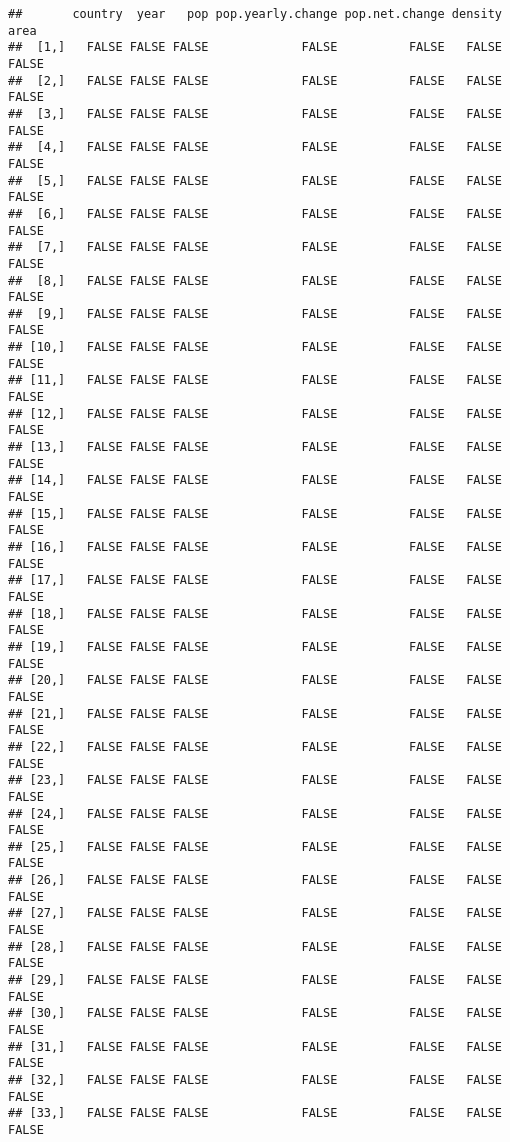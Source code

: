 \documentclass[
]{article}
\begin{document}
\begin{verbatim}
##       country  year   pop pop.yearly.change pop.net.change density  area
##  [1,]   FALSE FALSE FALSE             FALSE          FALSE   FALSE FALSE
##  [2,]   FALSE FALSE FALSE             FALSE          FALSE   FALSE FALSE
##  [3,]   FALSE FALSE FALSE             FALSE          FALSE   FALSE FALSE
##  [4,]   FALSE FALSE FALSE             FALSE          FALSE   FALSE FALSE
##  [5,]   FALSE FALSE FALSE             FALSE          FALSE   FALSE FALSE
##  [6,]   FALSE FALSE FALSE             FALSE          FALSE   FALSE FALSE
##  [7,]   FALSE FALSE FALSE             FALSE          FALSE   FALSE FALSE
##  [8,]   FALSE FALSE FALSE             FALSE          FALSE   FALSE FALSE
##  [9,]   FALSE FALSE FALSE             FALSE          FALSE   FALSE FALSE
## [10,]   FALSE FALSE FALSE             FALSE          FALSE   FALSE FALSE
## [11,]   FALSE FALSE FALSE             FALSE          FALSE   FALSE FALSE
## [12,]   FALSE FALSE FALSE             FALSE          FALSE   FALSE FALSE
## [13,]   FALSE FALSE FALSE             FALSE          FALSE   FALSE FALSE
## [14,]   FALSE FALSE FALSE             FALSE          FALSE   FALSE FALSE
## [15,]   FALSE FALSE FALSE             FALSE          FALSE   FALSE FALSE
## [16,]   FALSE FALSE FALSE             FALSE          FALSE   FALSE FALSE
## [17,]   FALSE FALSE FALSE             FALSE          FALSE   FALSE FALSE
## [18,]   FALSE FALSE FALSE             FALSE          FALSE   FALSE FALSE
## [19,]   FALSE FALSE FALSE             FALSE          FALSE   FALSE FALSE
## [20,]   FALSE FALSE FALSE             FALSE          FALSE   FALSE FALSE
## [21,]   FALSE FALSE FALSE             FALSE          FALSE   FALSE FALSE
## [22,]   FALSE FALSE FALSE             FALSE          FALSE   FALSE FALSE
## [23,]   FALSE FALSE FALSE             FALSE          FALSE   FALSE FALSE
## [24,]   FALSE FALSE FALSE             FALSE          FALSE   FALSE FALSE
## [25,]   FALSE FALSE FALSE             FALSE          FALSE   FALSE FALSE
## [26,]   FALSE FALSE FALSE             FALSE          FALSE   FALSE FALSE
## [27,]   FALSE FALSE FALSE             FALSE          FALSE   FALSE FALSE
## [28,]   FALSE FALSE FALSE             FALSE          FALSE   FALSE FALSE
## [29,]   FALSE FALSE FALSE             FALSE          FALSE   FALSE FALSE
## [30,]   FALSE FALSE FALSE             FALSE          FALSE   FALSE FALSE
## [31,]   FALSE FALSE FALSE             FALSE          FALSE   FALSE FALSE
## [32,]   FALSE FALSE FALSE             FALSE          FALSE   FALSE FALSE
## [33,]   FALSE FALSE FALSE             FALSE          FALSE   FALSE FALSE

\end{verbatim}
\end{document}
